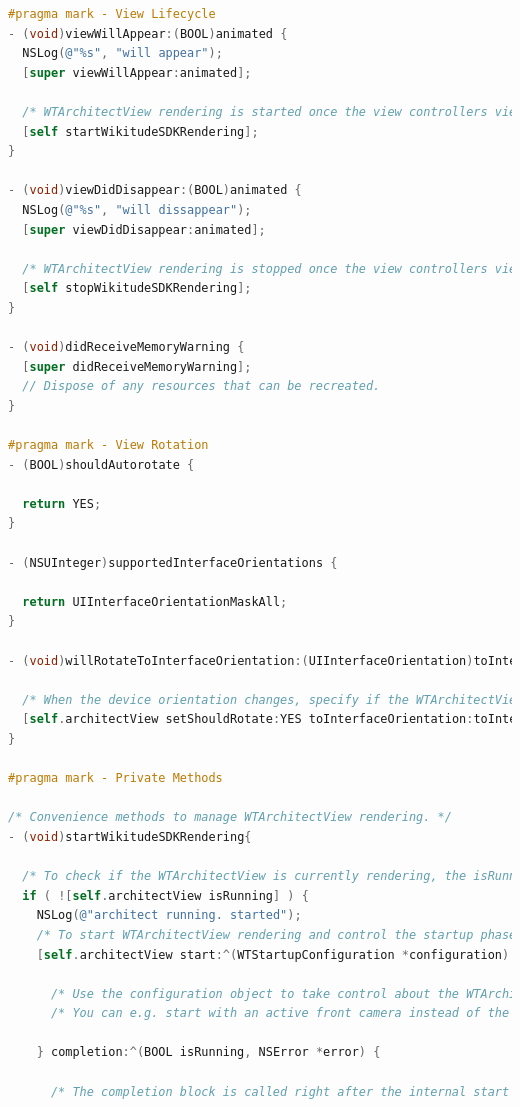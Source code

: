 \documentclass[thesis=M,english]{FITthesis}[2012/10/20]
\begin{document}
\begin{lstlisting}[language=C]
#pragma mark - View Lifecycle
- (void)viewWillAppear:(BOOL)animated {
  NSLog(@"%s", "will appear");
  [super viewWillAppear:animated];
  
  /* WTArchitectView rendering is started once the view controllers view will appear */
  [self startWikitudeSDKRendering];
}

- (void)viewDidDisappear:(BOOL)animated {
  NSLog(@"%s", "will dissappear");
  [super viewDidDisappear:animated];
  
  /* WTArchitectView rendering is stopped once the view controllers view did disappear */
  [self stopWikitudeSDKRendering];
}

- (void)didReceiveMemoryWarning {
  [super didReceiveMemoryWarning];
  // Dispose of any resources that can be recreated.
}

#pragma mark - View Rotation
- (BOOL)shouldAutorotate {
  
  return YES;
}

- (NSUInteger)supportedInterfaceOrientations {
  
  return UIInterfaceOrientationMaskAll;
}

- (void)willRotateToInterfaceOrientation:(UIInterfaceOrientation)toInterfaceOrientation duration:(NSTimeInterval)duration {
  
  /* When the device orientation changes, specify if the WTArchitectView object should rotate as well */
  [self.architectView setShouldRotate:YES toInterfaceOrientation:toInterfaceOrientation];
}

#pragma mark - Private Methods

/* Convenience methods to manage WTArchitectView rendering. */
- (void)startWikitudeSDKRendering{
  
  /* To check if the WTArchitectView is currently rendering, the isRunning property can be used */
  if ( ![self.architectView isRunning] ) {
    NSLog(@"architect running. started");
    /* To start WTArchitectView rendering and control the startup phase, the -start:completion method can be used */
    [self.architectView start:^(WTStartupConfiguration *configuration) {
      
      /* Use the configuration object to take control about the WTArchitectView startup phase */
      /* You can e.g. start with an active front camera instead of the default back camera */
      
    } completion:^(BOOL isRunning, NSError *error) {
      
      /* The completion block is called right after the internal start method returns.
       

\end{lstlisting}
\end{document}

